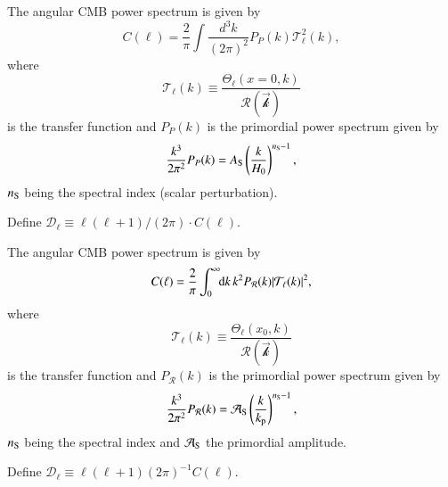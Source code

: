 

\please

The angular CMB power spectrum is given by
\begin{equation}
    C(\ell)= \frac{2}{\pi} \int \frac{d^3 k}{(2\pi)^2} P_P(k) \mathcal{T}_\ell^2 (k),
\end{equation}
where
\begin{equation}
    \mathcal{T}_\ell(k) \equiv \frac{\Theta_\ell(x\!=\!0, k)}{\mathcal{R(\vec{k})}}
\end{equation}
is the transfer function and $P_P(k)$ is the primordial power spectrum given by
\begin{equation}
    \frac{k^3}{2\pi^2} P_P (k) = A_\mathrm{S}\left( \frac{k}{H_0}\right)^{n_\mathrm{S}-1},
\end{equation}
$n_\mathrm{S}$ being the spectral index (scalar perturbation).


Define $\mathcal{D}_\ell \equiv \ell (\ell+1)/(2\pi) \cdot C(\ell) $.

\sendhelp

\please

The angular CMB power spectrum is given by
\begin{equation}
    C(\ell)= \frac{2}{\pi} \int_0^\infty \!\!\mathop{}\!\mathrm{d} {k}\, k^2 P_\mathcal{R}(k) \abs{\mathcal{T}_\ell (k)}^2,
\end{equation}
where
\begin{equation}
    \mathcal{T}_\ell(k) \equiv \frac{\Theta_\ell(x_0, k)}{\mathcal{R(\vec{k})}}
\end{equation}
is the transfer function and $P_\mathcal{R}(k)$ is the primordial power spectrum given by
\begin{equation}
    \frac{k^3}{2\pi^2} P_\mathcal{R} (k) = \mathcal{A}_\mathrm{S}\left( \frac{k}{k_\mathrm{p}}\right)^{n_\mathrm{S}-1},
\end{equation}
$n_\mathrm{S}$ being the spectral index and $\mathcal{A}_\mathrm{S}$ the primordial amplitude.


Define $\mathcal{D}_\ell \equiv \ell (\ell+1)(2\pi)^{-1} C(\ell) $.




\sendhelp

